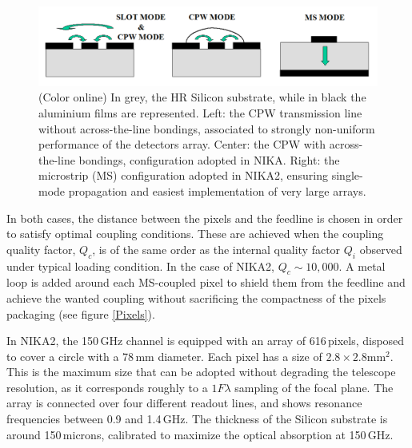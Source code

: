 \documentclass[]{aa} %
\begin{document}
\begin{figure}[h]
   \centering
    \includegraphics[width=.95\linewidth]{CPWvsMS.png}
      \caption{(Color online) In grey, the HR Silicon substrate, while in black the aluminium films are represented. Left: the CPW transmission line without across-the-line bondings, associated to strongly non-uniform performance of the detectors array. Center: the CPW with across-the-line bondings, configuration adopted in NIKA. Right: the microstrip (MS) configuration adopted in NIKA2, ensuring single-mode propagation and easiest implementation of very large arrays.}
         \label{CPWvsMS}
\end{figure}

In both cases, the distance between the pixels and the feedline is chosen in order to satisfy optimal coupling conditions. These are achieved when the coupling quality factor, $Q_c$, is of the same order as the internal quality factor $Q_i$ observed under typical loading condition. In the case of NIKA2, $Q_c\sim10,000$. A metal loop is added around each MS-coupled pixel to shield them from the feedline and achieve the wanted coupling without sacrificing the compactness of the pixels packaging (see figure \ref{Pixels}). 

In NIKA2, the 150\,GHz channel is equipped with an array of 616\,pixels, disposed to cover a circle with a 78\,mm diameter. Each pixel has a size of $2.8\times2.8\textrm{mm}^2$. This is the maximum size that can be adopted without degrading the telescope resolution, as it corresponds roughly to a $1 F \lambda$ sampling of the focal plane. The array is connected over four different readout lines, and shows resonance frequencies between 0.9 and 1.4\,GHz. The thickness of the Silicon substrate is around 150\,microns, calibrated to maximize the optical absorption at 150\,GHz. 
\end{document}

